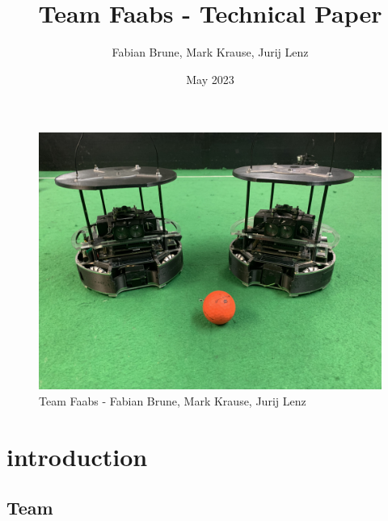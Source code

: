 \documentclass{scrartcl}
\title{Team Faabs - Technical Paper}
\author{Fabian Brune, Mark Krause, Jurij Lenz}
\date{May 2023}
\begin{document}
\maketitle


\begin{figure}[h]
    \centering
    \includegraphics[width=\textwidth]{img/Roboter mit Ball querformat 2.jpg}
    \caption{Team Faabs - Fabian Brune, Mark Krause, Jurij Lenz}
    \label{fig:team}
\end{figure}


\newpage
  

    \tableofcontents
     \newpage


    \section{introduction}
    \subsection{Team}
\end{document}
